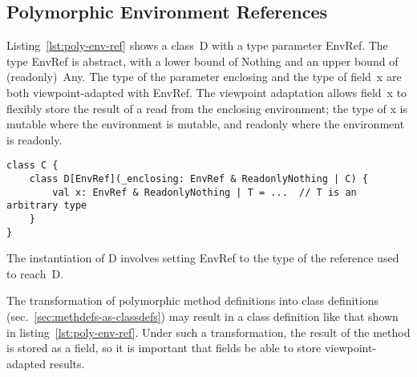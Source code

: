 \subsection{Polymorphic Environment References}

%



Listing~\ref{lst:poly-env-ref} shows a class~{\cd D} with a type parameter {\cd EnvRef}. The type {\cd EnvRef} is abstract, with a lower bound of {\cd Nothing} and an upper bound of (readonly)~{\cd Any}.
The type of the parameter {\cd \und enclosing} and the type of field~{\cd x} are both viewpoint-adapted with {\cd EnvRef}. The viewpoint adaptation allows field~{\cd x} to flexibly store the result of a read from the enclosing environment; the type of {\cd x} is mutable where the environment is mutable, and readonly where the environment is readonly.

\begin{lstlisting}[float=htbp, caption={Polymorphic Environment Reference}, label={lst:poly-env-ref}]
class C {
	class D[EnvRef](_enclosing: EnvRef & ReadonlyNothing | C) {
		val x: EnvRef & ReadonlyNothing | T = ...  // T is an arbitrary type
	}
}
\end{lstlisting}
% 

The instantiation of {\cd D} involves setting {\cd EnvRef} to the type of the reference used to reach~{\cd D}.


The transformation of polymorphic method definitions into class definitions (sec.~\ref{sec:methdefs-as-classdefs}) may result in a class definition like that shown in listing~\ref{lst:poly-env-ref}. Under such a transformation, the result of the method is stored as a field, so it is important that fields be able to store viewpoint-adapted results.

